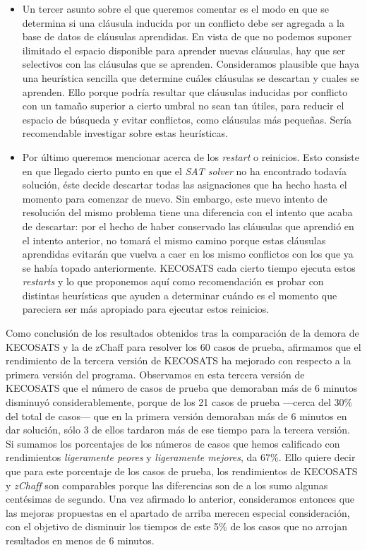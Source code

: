 \documentclass[12pt,lettersize,oneside]{article}
\begin{document}
\begin{itemize}
\item Un tercer asunto sobre el que queremos comentar es el modo en que se
  determina si una cláusula inducida por un conflicto debe ser agregada a la
  base de datos de cláusulas aprendidas. En vista de que no podemos suponer
  ilimitado el espacio disponible para aprender nuevas cláusulas, hay que ser
  selectivos con las cláusulas que se aprenden. Consideramos plausible que haya
  una heurística sencilla que determine cuáles cláusulas se descartan y cuales
  se aprenden. Ello porque podría resultar que cláusulas inducidas por conflicto
  con un tamaño superior a cierto umbral no sean tan útiles, para reducir el
  espacio de búsqueda y evitar conflictos, como cláusulas más pequeñas. Sería
  recomendable investigar sobre estas heurísticas.

\item Por último queremos mencionar acerca de los \emph{restart} o
  reinicios. Esto consiste en que llegado cierto punto en que el \emph{SAT
    solver} no ha encontrado todavía solución, éste decide descartar todas las
  asignaciones que ha hecho hasta el momento para comenzar de nuevo. Sin
  embargo, este nuevo intento de resolución del mismo problema tiene una
  diferencia con el intento que acaba de descartar: por el hecho de haber
  conservado las cláusulas que aprendió en el intento anterior, no tomará el
  mismo camino porque estas cláusulas aprendidas evitarán que vuelva a caer en
  los mismo conflictos con los que ya se había topado anteriormente. KECOSATS
  cada cierto tiempo ejecuta estos \emph{restarts} y lo que proponemos aquí como
  recomendación es probar con distintas heurísticas que ayuden a determinar
  cuándo es el momento que pareciera ser más apropiado para ejecutar estos
  reinicios.

\end{itemize}

Como conclusión de los resultados obtenidos tras la comparación de la demora de
KECOSATS y la de zChaff para resolver los 60 casos de prueba, afirmamos que el
rendimiento de la tercera versión de KECOSATS ha mejorado con respecto a la
primera versión del programa. Observamos en esta tercera versión de KECOSATS que
el número de casos de prueba que demoraban más de 6 minutos disminuyó
considerablemente, porque de los 21 casos de prueba ---cerca del 30\% del total
de casos--- que en la primera versión demoraban más de 6 minutos en dar
solución, sólo 3 de ellos tardaron más de ese tiempo para la tercera versión. Si
sumamos los porcentajes de los números de casos que hemos calificado con
rendimientos \emph{ligeramente peores} y \emph{ligeramente mejores}, da
67\%. Ello quiere decir que para este porcentaje de los casos de prueba, los
rendimientos de KECOSATS y \emph{zChaff} son comparables porque las diferencias
son de a los sumo algunas centésimas de segundo.  Una vez afirmado lo anterior,
consideramos entonces que las mejoras propuestas en el apartado de arriba
merecen especial consideración, con el objetivo de disminuir los tiempos de este
5\% de los casos que no arrojan resultados en menos de 6 minutos.
\end{document}
